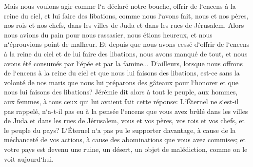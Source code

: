 \verse Mais nous voulons agir comme l`a déclaré notre bouche, offrir de l`encens à la reine du ciel, et lui faire des libations, comme nous l`avons fait, nous et nos pères, nos rois et nos chefs, dans les villes de Juda et dans les rues de Jérusalem. Alors nous avions du pain pour nous rassasier, nous étions heureux, et nous n`éprouvions point de malheur. 
\verse Et depuis que nous avons cessé d`offrir de l`encens à la reine du ciel et de lui faire des libations, nous avons manqué de tout, et nous avons été consumés par l`épée et par la famine... 
\verse D`ailleurs, lorsque nous offrons de l`encens à la reine du ciel et que nous lui faisons des libations, est-ce sans la volonté de nos maris que nous lui préparons des gâteaux pour l`honorer et que nous lui faisons des libations? 
\verse Jérémie dit alors à tout le peuple, aux hommes, aux femmes, à tous ceux qui lui avaient fait cette réponse: 
\verse L`Éternel ne s`est-il pas rappelé, n`a-t-il pas eu à la pensée l`encens que vous avez brûlé dans les villes de Juda et dans les rues de Jérusalem, vous et vos pères, vos rois et vos chefs, et le peuple du pays? 
\verse L`Éternel n`a pas pu le supporter davantage, à cause de la méchanceté de vos actions, à cause des abominations que vous avez commises; et votre pays est devenu une ruine, un désert, un objet de malédiction, comme on le voit aujourd`hui. 
